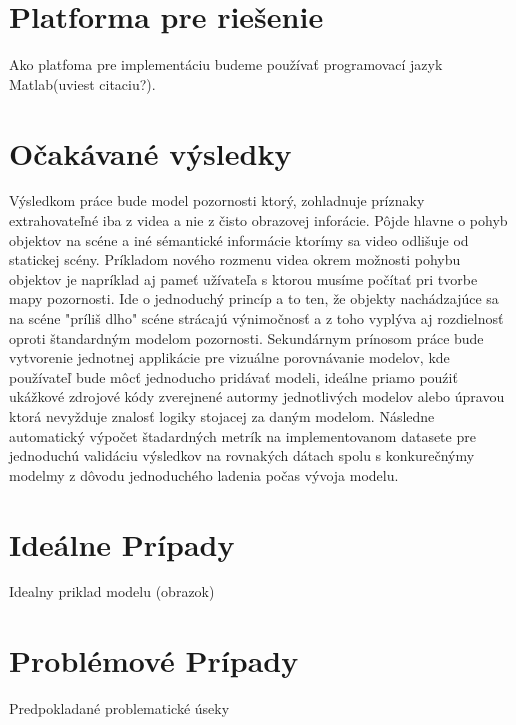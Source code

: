 \section{Platforma pre riešenie}
Ako platfoma pre implementáciu budeme používať programovací jazyk Matlab(uviest citaciu?).
\section{Očakávané výsledky}
Výsledkom práce bude model pozornosti ktorý, zohladnuje príznaky extrahovateľné iba z videa a nie z čisto obrazovej inforácie.
Pôjde hlavne o pohyb objektov na scéne a iné sémantické informácie ktorímy sa video odlišuje od statickej scény.
Príkladom nového rozmenu videa okrem možnosti pohybu objektov je napríklad aj pameť užívateľa s ktorou musíme počítať pri tvorbe mapy pozornosti.
Ide o jednoduchý princíp a to ten, že objekty nachádzajúce sa na scéne "príliš dlho" scéne strácajú výnimočnosť a z toho vyplýva aj rozdielnosť  oproti štandardným modelom pozornosti.
Sekundárnym prínosom práce bude vytvorenie jednotnej applikácie pre vizuálne porovnávanie modelov, kde používateľ bude môcť jednoducho pridávať modeli, ideálne priamo pouźiť ukážkové zdrojové kódy zverejnené autormy jednotlivých modelov alebo úpravou ktorá nevyžduje znalosť logiky stojacej za daným modelom.
Následne automatický výpočet štadardných metrík na implementovanom datasete pre jednoduchú validáciu výsledkov na rovnakých dátach spolu s konkurečnýmy modelmy z dôvodu jednoduchého ladenia počas vývoja modelu.
\section{Ideálne Prípady}
Idealny priklad modelu (obrazok)
\section{Problémové Prípady}
Predpokladané problematické úseky
